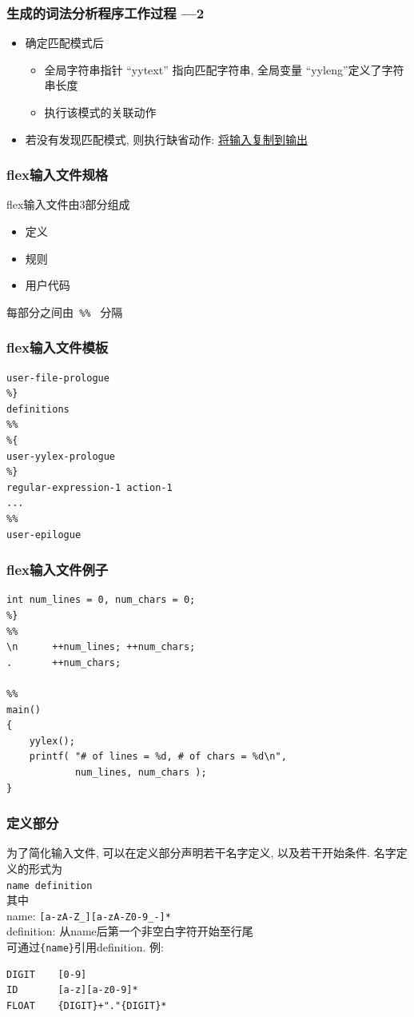 \documentclass[compress]{beamer}
\begin{document}
\begin{frame}
\frametitle{生成的词法分析程序工作过程 ---2 }
\begin{itemize}
\item 确定匹配模式后
    \begin{itemize}
    \item 全局字符串指针 ``yytext'' 指向匹配字符串, 全局变量 ``yyleng''定义了字符串长度
    \item 执行该模式的关联动作
    \end{itemize}
  \item 若没有发现匹配模式, 则执行缺省动作: \uline{将输入复制到输出}
\end{itemize}
\end{frame}

\begin{frame}[containsverbatim]
\frametitle{flex输入文件规格}

{flex}输入文件由3部分组成
\begin{itemize}
  \item 定义
  \item 规则
  \item 用户代码
\end{itemize}
每部分之间由\verb~ %% ~ 分隔


\end{frame}

\begin{frame}[containsverbatim]
\frametitle{flex输入文件模板}
\begin{Verbatim}[label=flex 模板]
%{
user-file-prologue
%}
definitions
%%
%{
user-yylex-prologue
%}
regular-expression-1 action-1
...
%%
user-epilogue
\end{Verbatim}
\end{frame}

\begin{frame}[containsverbatim]
\frametitle{flex输入文件例子}
\begin{Verbatim}[label=flex示例]
%{
int num_lines = 0, num_chars = 0;
%}
%%
\n      ++num_lines; ++num_chars;
.       ++num_chars;

%%
main()
{
    yylex();
    printf( "# of lines = %d, # of chars = %d\n",
            num_lines, num_chars );
}
\end{Verbatim}
\end{frame}

\begin{frame}[containsverbatim]
\frametitle{定义部分}

为了简化输入文件, 可以在定义部分声明若干名字定义, 以及若干开始条件.
名字定义的形式为\\
\verb~name definition~\\
其中 \\
name: \verb~[a-zA-Z_][a-zA-Z0-9_-]*~ \\
definition: 从name后第一个非空白字符开始至行尾\\
可通过\verb~{name}~引用definition. 例:\\
\begin{Verbatim}
DIGIT    [0-9]
ID       [a-z][a-z0-9]*
FLOAT    {DIGIT}+"."{DIGIT}*
\end{Verbatim}
\end{frame}
\end{document}
